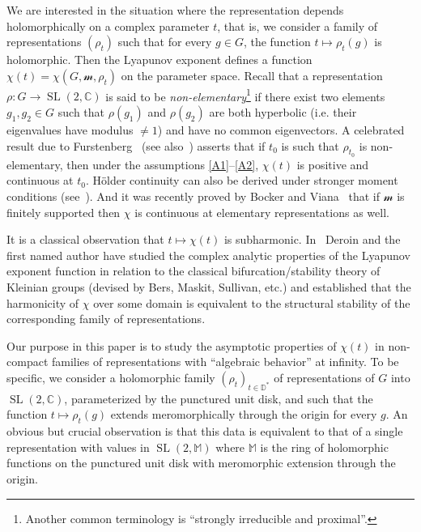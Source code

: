 \documentclass[11pt]{article}
\theoremstyle{definition}
\numberwithin{equation}{section}
\numberwithin{figure}{section}
\numberwithin{table}{section}
\DeclareMathOperator{\SL}{SL}
\newcommand{\dD}{\mathbb{D}}
\newcommand{\sm}{\mathcal{m}}
\newcommand{\mm}{\mathbb{M}}
\newcommand{\SLC}{\SL(2,\mathbb C)}
\begin{document}

We are interested in the situation where the representation depends holomorphically on a complex parameter $t$, that is, we consider a family of representations $(\rho_t)$ such that for every $g\in G$, the function $t\mapsto \rho_t(g)$ is holomorphic. Then the Lyapunov exponent defines a function $\chi(t) = \chi(G, \sm, \rho_t)$ on the parameter space. Recall that a representation $\rho: G \to \SLC$ is said to be \emph{non-elementary}\footnote{Another common terminology is ``strongly irreducible and proximal''.} if there exist two elements $g_1, g_2 \in G$ such that $\rho(g_1)$ and $\rho(g_2)$ are both hyperbolic (i.e. their eigenvalues have modulus $\neq 1$) and have no common eigenvectors. A celebrated result due to Furstenberg~\cite{furstenberg} (see also~\cite{furstenberg-kifer}) asserts that if $t_0$ is such that $\rho_{t_0}$ is non-elementary, then under the assumptions \eqref{A1}--\eqref{A2}, $\chi(t)$ is positive and continuous at $t_0$. H\"older continuity can also be derived under stronger moment conditions (see~\cite{lepage-holder}). And it was recently proved by Bocker and Viana~\cite{bocker-viana} that if $\sm$ is finitely supported then $\chi$ is continuous at elementary representations as well.

It is a classical observation that $t\mapsto \chi(t)$ is subharmonic. In~\cite{kleinbif, bers1} Deroin and the first named author have studied the complex analytic properties of the Lyapunov exponent function in relation to the classical bifurcation/stability theory of Kleinian groups (devised by Bers, Maskit, Sullivan, etc.) and established that the harmonicity of $\chi$ over some domain is equivalent to the structural stability of the corresponding family of representations.


Our purpose in this paper is to study the asymptotic properties of $\chi(t)$ in non-compact families of representations with ``algebraic behavior'' at infinity. To be specific, we consider a holomorphic family $(\rho_t)_{t\in \dD^*}$ of representations of $G$ into $\SLC$, parameterized by the punctured unit disk, and such that the function $t\mapsto \rho_t(g)$ extends meromorphically through the origin for every $g$. An obvious but crucial observation is that this data is equivalent to that of a single representation with values in $\SL(2, \mm)$ where $\mm$ is the ring of holomorphic functions on the punctured unit disk with meromorphic extension through the origin.
\end{document}

